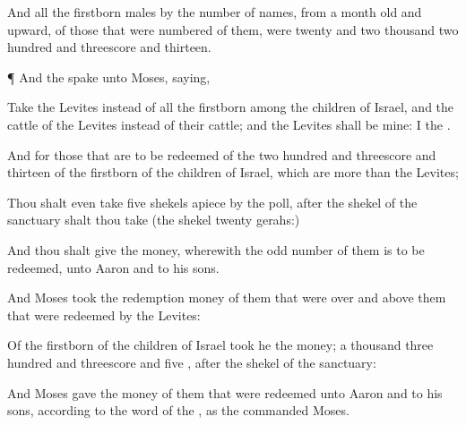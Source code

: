 {And all the
firstborn
males by the
number of
names, from a
month
old and
upward, of those that were
numbered of them, were
twenty and
two
thousand two
hundred and threescore and
thirteen.


\par }{\PP {}¶ And the
{}
spake unto
Moses,
saying,

Take the
Levites instead of all the
firstborn among the
children of
Israel, and the
cattle of the
Levites instead of their
cattle; and the
Levites shall be mine: I
{} the
{}.

And for those that are to be
redeemed of the two
hundred and threescore and
thirteen of the
firstborn of the
children of
Israel, which are
more
than the
Levites;

Thou shalt even
take
five
shekels apiece by the
poll, after the
shekel of the
sanctuary shalt thou
take
{} (the
shekel
{}
twenty
gerahs:)

And thou shalt
give the
money, wherewith the odd
number of them is to be
redeemed, unto
Aaron and to his
sons.

And
Moses
took the
redemption
money of them that were
over and above them that were
redeemed by the
Levites:

Of the
firstborn of the
children of
Israel
took he the
money; a
thousand
three
hundred and
threescore and
five
{}, after the
shekel of the
sanctuary:

And
Moses
gave the
money of them that were
redeemed unto
Aaron and to his
sons, according to the
word of the
{}, as the
{}
commanded
Moses.




\par }
